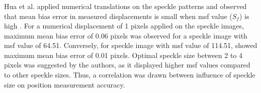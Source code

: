 



    \subsubsection{}
        Hua et al. applied numerical translations on the speckle patterns and observed that mean bias error in measured displacements is small when \gls{msf} value ($S_f$) is high \cite{hua_msf}. For a numerical displacement of 1 pixels applied on the speckle images, maximum mean bias error of 0.06 pixels was observed for a speckle image with \gls{msf} value of 64.51. Conversely, for speckle image with \gls{msf} value of 114.51, showed maximum mean bias error of 0.01 pixels.  Optimal speckle size between 2 to 4 pixels was suggested by the authors, as it displayed higher \gls{msf} values compared to other speckle sizes. Thus, a correlation was drawn between influence of speckle size on position measurement accuracy. 

        

